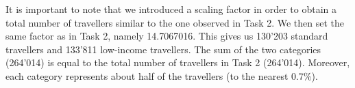 \documentclass[a4paper, 12pt,oneside]{article}
\begin{document}
It is important to note that we introduced a scaling factor in order to obtain a total number of travellers similar to the one observed in Task 2. We then set the same factor as in Task 2, namely 14.7067016. This gives us 130'203 standard travellers and 133'811 low-income travellers. The sum of the two categories (264'014) is equal to the total number of travellers in Task 2 (264'014). Moreover, each category represents about half of the travellers (to the nearest 0.7\%).

\end{document}
